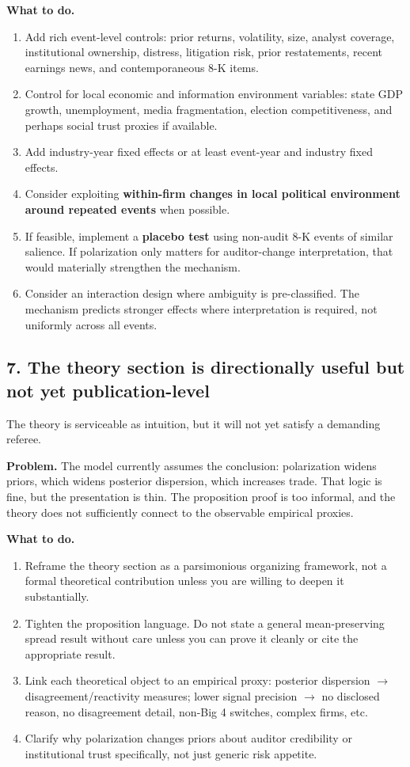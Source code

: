 \documentclass[12pt]{article}
\begin{document}
\textbf{What to do.}
\begin{enumerate}[leftmargin=2em]
    \item Add rich event-level controls: prior returns, volatility, size, analyst coverage, institutional ownership, distress, litigation risk, prior restatements, recent earnings news, and contemporaneous 8-K items.
    \item Control for local economic and information environment variables: state GDP growth, unemployment, media fragmentation, election competitiveness, and perhaps social trust proxies if available.
    \item Add industry-year fixed effects or at least event-year and industry fixed effects.
    \item Consider exploiting \textbf{within-firm changes in local political environment around repeated events} when possible.
    \item If feasible, implement a \textbf{placebo test} using non-audit 8-K events of similar salience. If polarization only matters for auditor-change interpretation, that would materially strengthen the mechanism.
    \item Consider an interaction design where ambiguity is pre-classified. The mechanism predicts stronger effects where interpretation is required, not uniformly across all events.
\end{enumerate}

\subsection{7. The theory section is directionally useful but not yet publication-level}
The theory is serviceable as intuition, but it will not yet satisfy a demanding referee.

\textbf{Problem.} The model currently assumes the conclusion: polarization widens priors, which widens posterior dispersion, which increases trade. That logic is fine, but the presentation is thin. The proposition proof is too informal, and the theory does not sufficiently connect to the observable empirical proxies.

\textbf{What to do.}
\begin{enumerate}[leftmargin=2em]
    \item Reframe the theory section as a parsimonious organizing framework, not a formal theoretical contribution unless you are willing to deepen it substantially.
    \item Tighten the proposition language. Do not state a general mean-preserving spread result without care unless you can prove it cleanly or cite the appropriate result.
    \item Link each theoretical object to an empirical proxy: posterior dispersion $\rightarrow$ disagreement/reactivity measures; lower signal precision $\rightarrow$ no disclosed reason, no disagreement detail, non-Big 4 switches, complex firms, etc.
    \item Clarify why polarization changes priors about auditor credibility or institutional trust specifically, not just generic risk appetite.
\end{enumerate}
\end{document}
